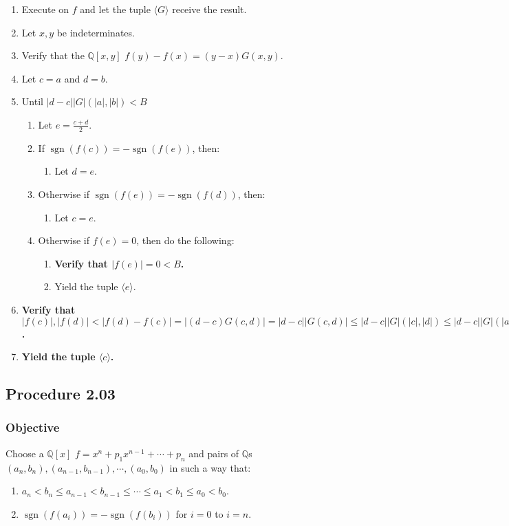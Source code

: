 \documentclass[twocolumn]{article}
\DeclareMathOperator{\sgn}{sgn}
\newcommand{\procedure}[2][]{\subsection*{Procedure #2 \ifthenelse{\equal{#1}{}}{}{(#1)}}\label{sec:procedure #2}}
\newcommand{\objective}{\subsubsection*{Objective}}
\newcommand{\procedurehr}[2][]{\hyperref[sec:procedure #2]{\ifthenelse{\equal{#1}{}}{procedure #2}{#1}}}
\begin{document}
				\begin{enumerate}
					\item Execute \procedurehr{2.00} on $f$ and let the tuple $\langle G\rangle$ receive the result.
					\item Let $x,y$ be indeterminates.
					\item Verify that the $\mathbb{Q}[x,y]$ $f(y)-f(x)=(y-x)G(x,y)$.
					\item Let $c=a$ and $d=b$.
					\item Until $\lvert d-c\rvert \lvert G\rvert(\lvert a\rvert,\lvert b\rvert)<B$
					\begin{enumerate}
						\item Let $e=\frac{c+d}{2}$.
						\item If $\sgn(f(c))=-\sgn(f(e))$, then:
						\begin{enumerate}
							\item Let $d=e$.
						\end{enumerate}
						\item Otherwise if $\sgn(f(e))=-\sgn(f(d))$, then:
						\begin{enumerate}
							\item Let $c=e$.
						\end{enumerate}
						\item Otherwise if $f(e)=0$, then do the following:
						\begin{enumerate}
							\item \textbf{Verify that $\lvert f(e)\rvert=0<B$.}
							\item Yield the tuple $\langle e\rangle$.
						\end{enumerate}
					\end{enumerate}
					\item \textbf{Verify that $\lvert f(c)\rvert,\lvert f(d)\rvert<\lvert f(d)-f(c)\rvert=\lvert(d-c)G(c,d)\rvert=\lvert d-c\rvert\lvert G(c,d)\rvert\le\lvert d-c\rvert\lvert G\rvert(\lvert c\rvert,\lvert d\rvert)\le\lvert d-c\rvert\lvert G\rvert(\lvert a\rvert,\lvert b\rvert)<B$.}
					\item \textbf{Yield the tuple $\langle c\rangle$.}
				\end{enumerate}
		\procedure{2.03}
			\objective
				Choose a $\mathbb{Q}[x]$ $f=x^n+p_1x^{n-1}+\cdots+p_n$ and pairs of $\mathbb{Q}$s $(a_n,b_n),(a_{n-1},b_{n-1}),\cdots,(a_0,b_0)$ in such a way that:
				\begin{enumerate}
					\item $a_n<b_n\le a_{n-1}<b_{n-1}\le\cdots\le a_1<b_1\le a_0<b_0$.
					\item $\sgn(f(a_i))=-\sgn(f(b_i))$ for $i=0$ to $i=n$.
				\end{enumerate}
\end{document}
